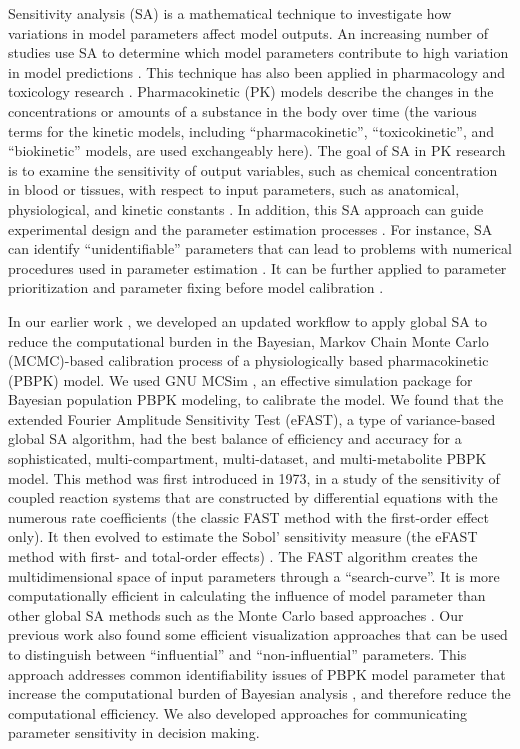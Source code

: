 \documentclass[preprint,12pt, a4paper]{elsarticle}
\begin{document}
Sensitivity analysis (SA) is a mathematical technique to investigate how
variations in model parameters affect model outputs. An increasing
number of studies use SA to determine which model parameters contribute
to high variation in model predictions \cite{ferretti2016trends}. This
technique has also been applied in pharmacology and toxicology research
\cite{loizou2015application, mcnally2012reconstruction}.
Pharmacokinetic (PK) models describe the changes in the concentrations
or amounts of a substance in the body over time (the various terms for
the kinetic models, including ``pharmacokinetic'', ``toxicokinetic'',
and ``biokinetic'' models, are used exchangeably here). The goal of SA
in PK research is to examine the sensitivity of output variables, such
as chemical concentration in blood or tissues, with respect to input
parameters, such as anatomical, physiological, and kinetic constants
\cite{mcnally2011workflow}. In addition, this SA approach can guide
experimental design and the parameter estimation processes
\cite{zhang2015sobol}. For instance, SA can identify ``unidentifiable''
parameters that can lead to problems with numerical procedures used in
parameter estimation \cite{chu2010quantitative}. It can be further
applied to parameter prioritization and parameter fixing before model
calibration \cite{fphar201800588}.

In our earlier work \cite{fphar201800588}, we developed an updated
workflow to apply global SA to reduce the computational burden in the
Bayesian, Markov Chain Monte Carlo (MCMC)-based calibration process of a
physiologically based pharmacokinetic (PBPK) model. We used GNU MCSim
\cite{bois2009gnu}, an effective simulation package for Bayesian
population PBPK modeling, to calibrate the model. We found that the
extended Fourier Amplitude Sensitivity Test (eFAST), a type of
variance-based global SA algorithm, had the best balance of efficiency
and accuracy for a sophisticated, multi-compartment, multi-dataset, and
multi-metabolite PBPK model. This method was first introduced in 1973, 
\cite{cukier1973study} in a study of the sensitivity of coupled reaction systems
that are constructed by differential equations with the numerous rate
coefficients (the classic FAST method with the first-order
effect only). It then evolved to estimate the Sobol' sensitivity measure
(the eFAST method with first- and
total-order effects) \cite{saltelli1999quantitative}. The FAST algorithm creates the multidimensional
space of input parameters through a ``search-curve''. It is more
computationally efficient in calculating the influence of model
parameter than other global SA methods such as the Monte Carlo based
approaches \cite{jansen1999analysis, owen2013better}. Our previous work
also found some efficient visualization approaches that can be used to
distinguish between ``influential'' and ``non-influential'' parameters.
This approach addresses common identifiability issues of PBPK model
parameter that increase the computational burden of Bayesian analysis
\cite{garcia2015identifiability}, and therefore reduce the
computational efficiency. We also developed approaches for communicating
parameter sensitivity in decision making.
\end{document}
